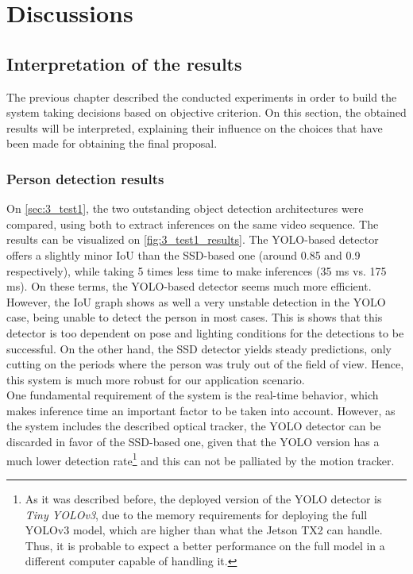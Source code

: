 \chapter{Discussions}
\label{chap:4_discussions}

\section{Interpretation of the results}
The previous chapter described the conducted experiments in order to build the system taking decisions based on objective criterion. On this section, the obtained results will be interpreted, explaining their influence on the choices that have been made for obtaining the final proposal.\\

\subsection{Person detection results}

On \autoref{sec:3_test1}, the two outstanding object detection architectures were compared, using both to extract inferences on the same video sequence. The results can be visualized on \autoref{fig:3_test1_results}. The YOLO-based detector offers a slightly minor IoU than the SSD-based one (around 0.85 and 0.9 respectively), while taking 5 times less time to make inferences (35 ms vs. 175 ms). On these terms, the YOLO-based detector seems much more efficient. However, the IoU graph shows as well a very unstable detection in the YOLO case, being unable to detect the person in most cases. This is shows that this detector is too dependent on pose and lighting conditions for the detections to be successful. On the other hand, the SSD detector yields steady predictions, only cutting on the periods where the person was truly out of the field of view. Hence, this system is much more robust for our application scenario.\\

One fundamental requirement of the system is the real-time behavior, which makes inference time an important factor to be taken into account. However, as the system includes the described optical tracker, the YOLO detector can be discarded in favor of the SSD-based one, given that the YOLO version has a much lower detection rate\footnote{As it was described before, the deployed version of the YOLO detector is \textit{Tiny YOLOv3}, due to the memory requirements for deploying the full YOLOv3 model, which are higher than what the Jetson TX2 can handle. Thus, it is probable to expect a better performance on the full model in a different computer capable of handling it.} and this can not be palliated by the motion tracker.\\

